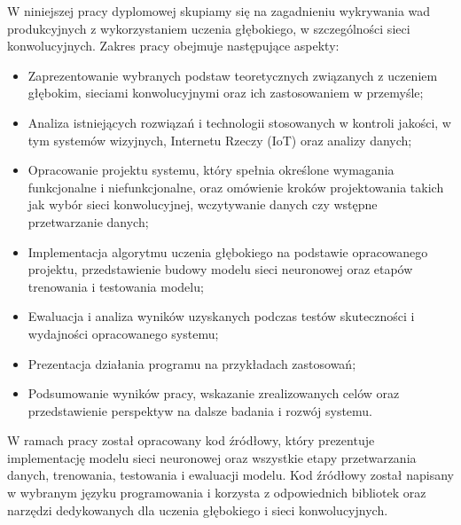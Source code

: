 W niniejszej pracy dyplomowej skupiamy się na zagadnieniu wykrywania wad produkcyjnych z wykorzystaniem uczenia głębokiego, w szczególności sieci konwolucyjnych. Zakres pracy obejmuje następujące aspekty:

\begin{itemize}
\item Zaprezentowanie wybranych podstaw teoretycznych związanych z uczeniem głębokim, sieciami konwolucyjnymi oraz ich zastosowaniem w przemyśle;
\item Analiza istniejących rozwiązań i technologii stosowanych w kontroli jakości, w tym systemów wizyjnych, Internetu Rzeczy (IoT) oraz analizy danych;
\item Opracowanie projektu systemu, który spełnia określone wymagania funkcjonalne i niefunkcjonalne, oraz omówienie kroków projektowania takich jak wybór sieci konwolucyjnej, wczytywanie danych czy wstępne przetwarzanie danych;
\item Implementacja algorytmu uczenia głębokiego na podstawie opracowanego projektu, przedstawienie budowy modelu sieci neuronowej oraz etapów trenowania i testowania modelu;
\item Ewaluacja i analiza wyników uzyskanych podczas testów skuteczności i wydajności opracowanego systemu;
\item Prezentacja działania programu na przykładach zastosowań;
\item Podsumowanie wyników pracy, wskazanie zrealizowanych celów oraz przedstawienie perspektyw na dalsze badania i rozwój systemu.
\end{itemize}

W ramach pracy został opracowany kod źródłowy, który prezentuje implementację modelu sieci neuronowej oraz wszystkie etapy przetwarzania danych, trenowania, testowania i ewaluacji modelu. Kod źródłowy został napisany w wybranym języku programowania i korzysta z odpowiednich bibliotek oraz narzędzi dedykowanych dla uczenia głębokiego i sieci konwolucyjnych.